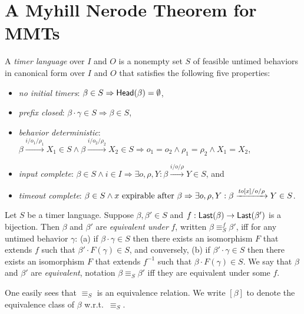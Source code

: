 \section{A Myhill Nerode Theorem for MMTs}
\label{sec:nerode}

\begin{definition}
\label{def:timer language}
A \emph{timer language} over $I$ and $O$ is a nonempty set 
$S$ of feasible untimed behaviors in canonical form over $I$ and $O$ that satisfies the following five properties:
\begin{itemize}
\item
\emph{no initial timers}: $\beta \in S \Rightarrow \mathsf{Head}({\beta}) = \emptyset$,
\item
\emph{prefix closed}: $\beta \cdot \gamma \in S \Rightarrow \beta \in S$,
\item
\emph{behavior deterministic}:
$\beta \xrightarrow{i/o_1/\rho_1} X_1 \in S \wedge \beta \xrightarrow{i/o_2/\rho_2} X_2 \in S \Rightarrow o_1 = o_2 \wedge \rho_1 = \rho_2 \wedge X_1 = X_2$,
\item
\emph{input complete}:
$\beta \in S \wedge i \in I \Rightarrow \exists o, \rho, Y : \beta \xrightarrow{i/o/\rho} Y \in S$,
and
\item
\emph{timeout complete}:
$\beta \in S \wedge x \mbox{ expirable after } \beta \Rightarrow
\exists o, \rho, Y: \beta \xrightarrow{\mathit{to}[x]/o/\rho} Y \in S$.
\end{itemize}
\end{definition}

\begin{definition}
\label{def:nerode}
Let $S$ be a timer language.
Suppose $\beta, \beta' \in S$ and $f : \mathsf{Last}({\beta})  \to \mathsf{Last}({\beta'})$ is a bijection.
Then $\beta$ and $\beta'$ are \emph{equivalent under} $f$, written $\beta \equiv^f_S \beta'$, iff  for any untimed behavior $\gamma$:
(a) if $\beta \cdot \gamma \in S$ then there exists an isomorphism $F$ that extends $f$ such that $\beta' \cdot F(\gamma) \in S$, and conversely,
(b) if $\beta' \cdot \gamma \in S$ then there exists an isomorphism $F$ that extends $f^{-1}$ such that $\beta \cdot F(\gamma) \in S$.
We say that $\beta$ and $\beta'$ are \emph{equivalent}, notation $\beta \equiv_S \beta'$ iff they are equivalent under some $f$.
\end{definition}

One easily sees that $\equiv_S$ is an equivalence relation.
We write $[\beta]$ to denote the equivalence class of $\beta$ w.r.t.\  $\equiv_S$.

